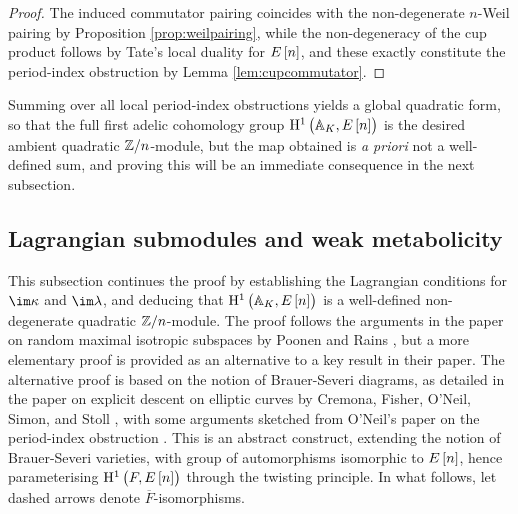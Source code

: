 \begin{proof}
The induced commutator pairing coincides with the non-degenerate $ n $-Weil pairing by Proposition \ref{prop:weilpairing}, while the non-degeneracy of the cup product follows by Tate's local duality for $ E\sbr{n} $, and these exactly constitute the period-index obstruction by Lemma \ref{lem:cupcommutator}.
\end{proof}

Summing over all local period-index obstructions yields a global quadratic form, so that the full first adelic cohomology group $ \HE[n]{\AA_K} $ is the desired ambient quadratic $ \mathbb{Z} / n $-module, but the map obtained is \textit{a priori} not a well-defined sum, and proving this will be an immediate consequence in the next subsection.

\pagebreak

\subsection{Lagrangian submodules and weak metabolicity}

This subsection continues the proof by establishing the Lagrangian conditions for $ \im \kappa $ and $ \im \lambda $, and deducing that $ \HE[n]{\AA_K} $ is a well-defined non-degenerate quadratic $ \mathbb{Z} / n $-module. The proof follows the arguments in the paper on random maximal isotropic subspaces by Poonen and Rains \cite{PR12}, but a more elementary proof is provided as an alternative to a key result in their paper. The alternative proof is based on the notion of Brauer-Severi diagrams, as detailed in the paper on explicit descent on elliptic curves by Cremona, Fisher, O'Neil, Simon, and Stoll \cite{CFOSS06}, with some arguments sketched from O'Neil's paper on the period-index obstruction \cite{ONe01}. This is an abstract construct, extending the notion of Brauer-Severi varieties, with group of automorphisms isomorphic to $ E\sbr{n} $, hence parameterising $ \HE[n]{F} $ through the twisting principle. In what follows, let dashed arrows denote $ \overline{F} $-isomorphisms.

